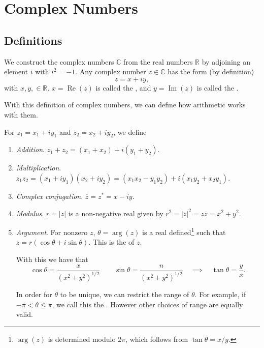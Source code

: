\documentclass[a4]{scrreprt}
\begin{document}
\clearpage

\chapter{Complex Numbers}

\section{Definitions}

We construct the complex numbers $\mathbb{C}$ from the real numbers $\mathbb{R}$ by adjoining an element $i$ with $i^2 = -1$.
Any complex number $z \in \mathbb{C}$ has the form (by definition)
$$
z = x + iy,
$$
with $x, y, \in \mathbb{R}$. $x = \operatorname{Re}(z)$ is called the , and $y = \operatorname{Im}(z)$ is called the .

With this definition of complex numbers, we can define how arithmetic works with them.

\begin{definition}\label{def:complex-arithmetic}
	For $z_1 = x_1 + i y_1$ and $z_2 = x_2 + i y_2$, we define
\begin{enumerate}[label=(\roman*)]
	\item \emph{Addition}. $z_1 + z_2 = (x_1 + x_2) + i(y_1 + y_2)$.
	\item \emph{Multiplication}. $z_1 z_2 = (x_1 + i y_1)(x_2 + i y_2) = (x_1 x_2 - y_1 y_2) + i(x_1 y_2 + x_2 y_1)$.
	\item \emph{Complex conjugation}. $\overline{z} = z^* = x - iy$.
	\item \emph{Modulus}. $r = |z|$ is a non-negative real given by $r^2 = |z|^2 = z \overline{z} = x^2 + y^2$.
	\item \emph{Argument}. For nonzero $z$, $\theta = \operatorname{arg}(z)$ is a real defined\footnote{$\operatorname{arg}(z)$ is determined modulo $2\pi$, which follows from $\tan \theta = x/y$.} such that $z = r(\cos \theta + i \sin \theta)$. This is the  of $z$.
	
	With this we have that
	$$
	\cos \theta=\frac{x}{\left(x^{2}+y^{2}\right)^{1 / 2}} \quad \quad \sin \theta=\frac{n}{\left(x^{2}+y^{2}\right)^{1 / 2}} \quad \implies  \quad \tan \theta=\frac{y}{x}.
	$$

	In order for $\theta$ to be unique, we can restrict the range of $\theta$. For example, if $-\pi < \theta \leq \pi$, we call this the . However other choices of range are equally valid.
\end{enumerate}
\end{definition}
\end{document}
